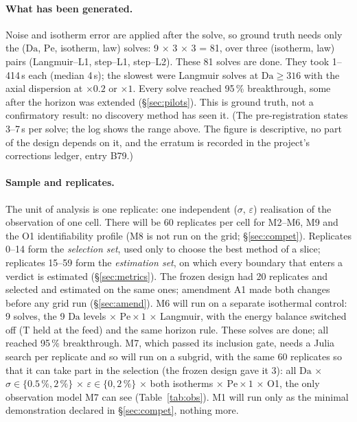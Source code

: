 \documentclass[11pt]{article}
\newcommand{\Da}{\mathrm{Da}}
\newcommand{\Pe}{\mathrm{Pe}}
\begin{document}
\paragraph{What has been generated.} Noise and isotherm error are applied after the
solve, so ground truth needs only the ($\Da$, $\Pe$, isotherm, law) solves: 9 $\times$ 3
$\times$ 3 = 81, over three (isotherm, law) pairs (Langmuir--L1, step--L1, step--L2).
These 81 solves are done. They took 1--414\,s each (median 4\,s); the slowest were
Langmuir solves at $\Da \ge 316$ with the axial dispersion at $\times 0.2$ or $\times 1$. Every solve reached 95\,\% breakthrough,
some after the horizon was extended (\S\ref{sec:pilots}). This is ground truth, not a
confirmatory result: no discovery method has seen it. (The pre-registration states 3--7\,s
per solve; the log shows the range above. The figure is descriptive, no part of the design
depends on it, and the erratum is recorded in the project's corrections ledger, entry
B79.)

\paragraph{Sample and replicates.} The unit of analysis is one replicate: one
independent ($\sigma$, $\varepsilon$) realisation of the observation of one cell. There
will be 60 replicates per cell for M2--M6, M9 and the O1 identifiability profile (M8 is not
run on the grid; \S\ref{sec:compet}). Replicates 0--14 form the \emph{selection set}, used
only to choose the best method of a slice; replicates 15--59 form the \emph{estimation
set}, on which every boundary that enters a verdict is estimated (\S\ref{sec:metrics}).
The frozen design had 20 replicates and selected and estimated on the same ones; amendment
A1 made both changes before any grid run (\S\ref{sec:amend}). M6 will run on a separate isothermal control: 9 solves, the 9 $\Da$
levels $\times$ $\Pe \times 1$ $\times$ Langmuir, with the energy balance switched off (T
held at the feed) and the same horizon rule. These solves are done; all reached
95\,\% breakthrough. M7, which passed its inclusion gate, needs a Julia search per
replicate and so will run on a subgrid, with the same 60 replicates so that it can take
part in the selection (the frozen design gave it 3): all $\Da$ $\times$ $\sigma \in
\{0.5\,\%, 2\,\%\}$ $\times$ $\varepsilon \in \{0, 2\,\%\}$ $\times$ both isotherms
$\times$ $\Pe \times 1$ $\times$ O1, the only observation model M7 can see
(Table~\ref{tab:obs}). M1 will run only as the minimal demonstration declared in
\S\ref{sec:compet}, nothing more.
\end{document}
